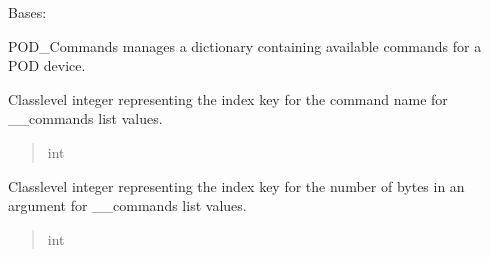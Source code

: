 \documentclass[letterpaper,10pt,english]{sphinxmanual}
\begin{document}
\begin{fulllineitems}
\label{\detokenize{PodCommands:PodCommands.POD_Commands}}
\pysigstartsignatures
{}
\pysigstopsignatures
\sphinxAtStartPar
Bases: 

\sphinxAtStartPar
POD\_Commands manages a dictionary containing available commands for a POD device.

\begin{fulllineitems}
\label{\detokenize{PodCommands:PodCommands.POD_Commands.__NAME}}
\pysigstartsignatures
{}
\pysigstopsignatures
\sphinxAtStartPar
Class\sphinxhyphen{}level integer representing the index key for the command name for \_\_commands             list values.
\begin{quote}\begin{description}
\sphinxAtStartPar
int

\end{description}\end{quote}

\end{fulllineitems}


\begin{fulllineitems}
\label{\detokenize{PodCommands:PodCommands.POD_Commands.__ARGUMENTS}}
\pysigstartsignatures
{}
\pysigstopsignatures
\sphinxAtStartPar
Class\sphinxhyphen{}level integer representing the index key for the number of bytes in an             argument for \_\_commands list values.
\begin{quote}\begin{description}
\sphinxAtStartPar
int

\end{description}\end{quote}

\end{fulllineitems}



\end{fulllineitems}
\end{document}
